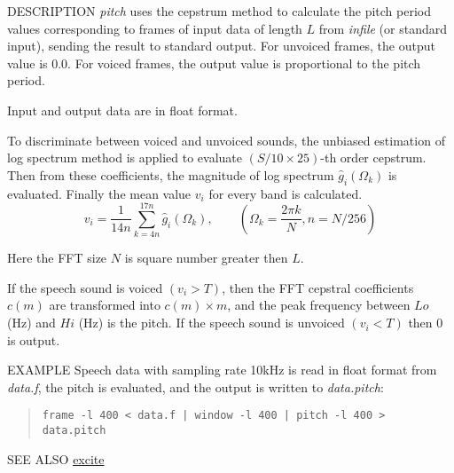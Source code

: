 \begin{synopsis}
\item[pitch] [ --s $S$ ] [ --l $L$ ] [ --t $T$ ]
 [ --L $Lo$ ] [ --H $Hi$ ] [ --e $E$ ]
\item[\ ~~~~~] [ --i $I$ ] [ --j $J$ ] [ --d $D$ ] [ {\em infile} ] 
\end{synopsis}

\begin{qsection}{DESCRIPTION}
{\em pitch} uses the cepstrum method to calculate the pitch period values
corresponding to frames of input data of length $L$ 
from {\em infile} (or standard input), 
sending the result to standard output. 
For unvoiced frames, the output value is 0.0. 
For voiced frames, the output value is proportional to the pitch period.

Input and output data are in float format.

To discriminate between voiced and unvoiced sounds,
the unbiased estimation of log spectrum method is applied
to evaluate $(S/10 \times 25)$-th order cepstrum.
Then from these coefficients, the magnitude of log spectrum
$\hat{g}_i(\Omega_k)$ is evaluated.
Finally the mean value $v_i$ for every band is calculated.
\begin{displaymath}
v_i = \frac{1}{14 n}\sum_{k = 4 n}^{17 n}\hat{g}_i(\Omega_k),\qquad (\Omega_k = \frac{2 \pi k}{N},n = N /256)
\end{displaymath}

Here the FFT size $N$ is square number greater then $L$.

If the speech sound is voiced $(v_i > T)$,
then the FFT cepstral coefficients $c(m)$ are transformed
into $c(m) \times m$,
and the peak frequency between $Lo$ (Hz) and $Hi$ (Hz)
is the pitch.
If the speech sound is unvoiced $(v_i < T)$
then $0$ is output.

\end{qsection}

\begin{options}
\end{options}

\begin{qsection}{EXAMPLE}
Speech data with sampling rate 10kHz is read in float format
from {\em data.f}, the pitch is evaluated, and
the output is written to {\em data.pitch}:
\begin{quote}
  \verb!frame -l 400 < data.f | window -l 400 | pitch -l 400 > data.pitch !
\end{quote}
\end{qsection}

\begin{qsection}{SEE ALSO}
\hyperlink{excite}{excite}
\end{qsection}
